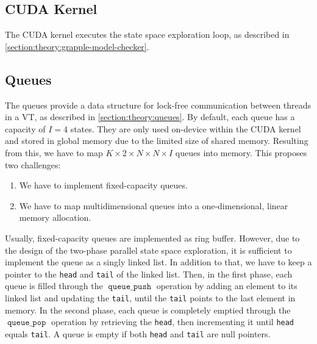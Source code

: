 \documentclass[
fancyheadings, %
%
%
]{stsreprt}
\DeclareMathOperator{\qPop}{\texttt{queue\_pop}}
\DeclareMathOperator{\qPush}{\texttt{queue\_push}}
\begin{document}
\subsection{CUDA Kernel}

The CUDA kernel executes the state space exploration loop, as described in \cref{section:theory:grapple-model-checker}.


\subsection{Queues}
\label{section:implementation:queues}

The queues provide a data structure for lock-free communication between threads in a VT, as described in \cref{section:theory:queues}.
By default, each queue has a capacity of $I=4$ states.
They are only used on-device within the CUDA kernel and stored in global memory due to the limited size of shared memory.
Resulting from this, we have to map $K \times 2 \times N \times N \times I$ queues into memory.
This proposes two challenges:

\begin{enumerate}
    \item We have to implement fixed-capacity queues.
    \item We have to map multidimensional queues into a one-dimensional, linear memory allocation.
\end{enumerate}

Usually, fixed-capacity queues are implemented as ring buffer.
However, due to the design of the two-phase parallel state space exploration, it is sufficient to implement the queue as a singly linked list.
In addition to that, we have to keep a pointer to the \texttt{head} and \texttt{tail} of the linked list.
Then, in the first phase, each queue is filled through the $\qPush$ operation by adding an element to its linked list and updating the \texttt{tail}, until the \texttt{tail} points to the last element in memory.
In the second phase, each queue is completely emptied through the $\qPop$ operation by retrieving the \texttt{head}, then incrementing it until \texttt{head} equals \texttt{tail}.
A queue is empty if both \texttt{head} and \texttt{tail} are null pointers.
\end{document}
